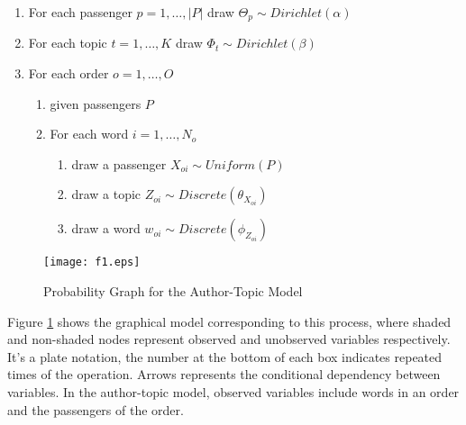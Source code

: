 \documentclass{llncs}
\begin{document}
\begin{enumerate}
\item For each passenger $p=1,\dots,|P|$ draw $\Theta_p \sim Dirichlet(\alpha)$
\item For each topic $t=1,\dots,K$ draw $\Phi_t \sim Dirichlet(\beta)$
\item For each order $o=1,\dots,O$
       \begin{enumerate}[fullwidth,itemindent=1em,label=(\alph*)]
       \item given passengers $P$
       \item For each word $i=1,\dots, N_o$
              \begin{enumerate}[fullwidth,itemindent=2em,label=(\roman*)]
              \item draw a passenger $X_{oi} \sim Uniform(P)$
              \item draw a topic $Z_{oi} \sim Discrete(\theta_{X_{oi}})$
              \item draw a word $w_{oi} \sim Discrete(\phi_{Z_{oi}})$
              \end{enumerate}
       \end{enumerate}
\end{enumerate}
\begin{figure}[!hbt]
\centering
\texttt{[image: f1.eps]}
\caption{Probability Graph for the Author-Topic Model}
\label{fig:mod}
\end{figure}\par
Figure \ref{fig:mod} shows the graphical model corresponding to this process, where shaded and non-shaded nodes represent observed and unobserved variables respectively. It's a plate notation, the number at the bottom of each box indicates repeated times of the operation. Arrows represents the conditional dependency between variables. In the author-topic model, observed variables include words in an order and the passengers of the order.
\end{document}
